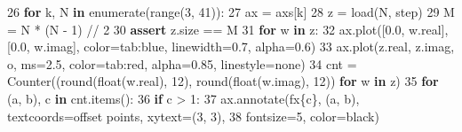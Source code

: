 \documentclass[
  a4paper,
]{ltjsarticle}
\newenvironment{Shaded}{}{}
\newcommand{\BuiltInTok}[1]{\textcolor[rgb]{0.00,0.50,0.00}{#1}}
\newcommand{\ControlFlowTok}[1]{\textcolor[rgb]{0.00,0.44,0.13}{\textbf{#1}}}
\newcommand{\DecValTok}[1]{\textcolor[rgb]{0.25,0.63,0.44}{#1}}
\newcommand{\FloatTok}[1]{\textcolor[rgb]{0.25,0.63,0.44}{#1}}
\newcommand{\KeywordTok}[1]{\textcolor[rgb]{0.00,0.44,0.13}{\textbf{#1}}}
\newcommand{\NormalTok}[1]{#1}
\newcommand{\OperatorTok}[1]{\textcolor[rgb]{0.40,0.40,0.40}{#1}}
\newcommand{\SpecialCharTok}[1]{\textcolor[rgb]{0.25,0.44,0.63}{#1}}
\newcommand{\SpecialStringTok}[1]{\textcolor[rgb]{0.73,0.40,0.53}{#1}}
\newcommand{\StringTok}[1]{\textcolor[rgb]{0.25,0.44,0.63}{#1}}
\newcounter{none} %
\begin{document}
\begin{Shaded}
\begin{Highlighting}[]
    \DecValTok{26}      \ControlFlowTok{for}\NormalTok{ k, N }\KeywordTok{in} \BuiltInTok{enumerate}\NormalTok{(}\BuiltInTok{range}\NormalTok{(}\DecValTok{3}\NormalTok{, }\DecValTok{41}\NormalTok{)):}
    \DecValTok{27}\NormalTok{          ax }\OperatorTok{=}\NormalTok{ axs[k]}
    \DecValTok{28}\NormalTok{          z }\OperatorTok{=}\NormalTok{ load(N, step)}
    \DecValTok{29}\NormalTok{          M }\OperatorTok{=}\NormalTok{ N }\OperatorTok{*}\NormalTok{ (N }\OperatorTok{{-}} \DecValTok{1}\NormalTok{) }\OperatorTok{//} \DecValTok{2}
    \DecValTok{30}          \ControlFlowTok{assert}\NormalTok{ z.size }\OperatorTok{==}\NormalTok{ M}
    \DecValTok{31}          \ControlFlowTok{for}\NormalTok{ w }\KeywordTok{in}\NormalTok{ z:}
    \DecValTok{32}\NormalTok{              ax.plot([}\FloatTok{0.0}\NormalTok{, w.real], [}\FloatTok{0.0}\NormalTok{, w.imag], color}\OperatorTok{=}\StringTok{\textquotesingle{}tab:blue\textquotesingle{}}\NormalTok{, linewidth}\OperatorTok{=}\FloatTok{0.7}\NormalTok{, alpha}\OperatorTok{=}\FloatTok{0.6}\NormalTok{)}
    \DecValTok{33}\NormalTok{          ax.plot(z.real, z.imag, }\StringTok{\textquotesingle{}o\textquotesingle{}}\NormalTok{, ms}\OperatorTok{=}\FloatTok{2.5}\NormalTok{, color}\OperatorTok{=}\StringTok{\textquotesingle{}tab:red\textquotesingle{}}\NormalTok{, alpha}\OperatorTok{=}\FloatTok{0.85}\NormalTok{, linestyle}\OperatorTok{=}\StringTok{\textquotesingle{}none\textquotesingle{}}\NormalTok{)}
    \DecValTok{34}\NormalTok{          cnt }\OperatorTok{=}\NormalTok{ Counter((}\BuiltInTok{round}\NormalTok{(}\BuiltInTok{float}\NormalTok{(w.real), }\DecValTok{12}\NormalTok{), }\BuiltInTok{round}\NormalTok{(}\BuiltInTok{float}\NormalTok{(w.imag), }\DecValTok{12}\NormalTok{)) }\ControlFlowTok{for}\NormalTok{ w }\KeywordTok{in}\NormalTok{ z)}
    \DecValTok{35}          \ControlFlowTok{for}\NormalTok{ (a, b), c }\KeywordTok{in}\NormalTok{ cnt.items():}
    \DecValTok{36}              \ControlFlowTok{if}\NormalTok{ c }\OperatorTok{\textgreater{}} \DecValTok{1}\NormalTok{:}
    \DecValTok{37}\NormalTok{                  ax.annotate(}\SpecialStringTok{f\textquotesingle{}x}\SpecialCharTok{\{}\NormalTok{c}\SpecialCharTok{\}}\SpecialStringTok{\textquotesingle{}}\NormalTok{, (a, b), textcoords}\OperatorTok{=}\StringTok{\textquotesingle{}offset points\textquotesingle{}}\NormalTok{, xytext}\OperatorTok{=}\NormalTok{(}\DecValTok{3}\NormalTok{, }\DecValTok{3}\NormalTok{),}
    \DecValTok{38}\NormalTok{                              fontsize}\OperatorTok{=}\DecValTok{5}\NormalTok{, color}\OperatorTok{=}\StringTok{\textquotesingle{}black\textquotesingle{}}\NormalTok{)}

\end{Highlighting}
\end{Shaded}
\end{document}
